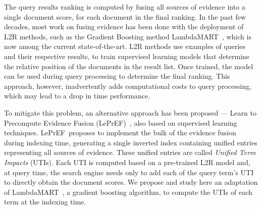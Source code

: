 \documentclass[preprint,review,10pt,3p]{elsarticle}
\begin{document}

The query results ranking is computed by fusing all sources of evidence into a single document score, for each document in the final ranking. In the past few decades, most work on fusing evidence has been done with the deployment of L2R methods, such as  the Gradient Boosting method LambdaMART~\cite{wu2010lambdamart}, which is now among the current state-of-the-art. L2R methods use examples of queries and their respective results, to train supervised learning models that determine the relative position of the documents in the result list. Once trained, the model can be used during query processing to determine the final ranking. This approach, however, inadvertently adds computational costs to query processing, which may lead to a drop in time performance.


\newcommand{\lepref}{LePrEF}
\newcommand{\lambdamart}{LambdaMART}

To mitigate this problem, an alternative approach has been proposed --- Learn to Precompute Evidence Fusion (\lepref)~\cite{costa2012lepref}, also based on supervised learning techniques. \lepref\ proposes to implement the bulk of the evidence fusion during indexing time, generating a single inverted index containing unified entries representing all sources of evidence. These unified entries are called \textit{Unified Term Impacts} (UTIs). 
Each UTI is computed based on a pre-trained L2R model and, at query time, the search engine needs only to add each of the query term's UTI to directly obtain the document scores.
We  propose and study here an adaptation of \lambdamart~\cite{wu2010lambdamart}, a gradient boosting algorithm, to compute the UTIs of each term at the indexing time.
\end{document}
